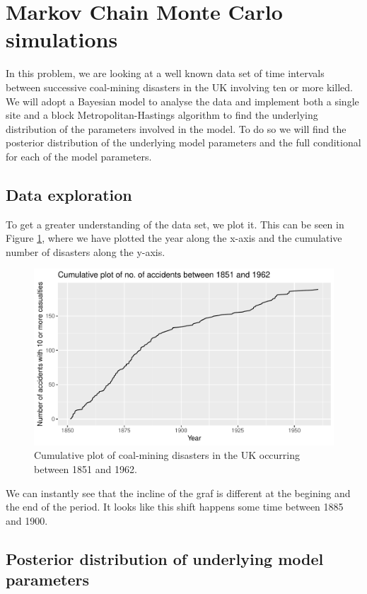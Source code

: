 \section{Markov Chain Monte Carlo simulations}

In this problem, we are looking at a well known data set of time intervals between successive coal-mining disasters in the UK involving ten or more killed. We will adopt a Bayesian model to analyse the data and implement both a single site and a block Metropolitan-Hastings algorithm to find the underlying distribution of the parameters involved in the model. To do so we will find the posterior distribution of the underlying model parameters and the full conditional for each of the model parameters. 

\subsection{Data exploration}
To get a greater understanding of the data set, we plot it. This can be seen in Figure \ref{fig:cumul_plot}, where we have plotted the year along the x-axis and the cumulative number of disasters along the y-axis. 

\begin{figure}[h]
    \centering
    \includegraphics[width = \textwidth]{Images/cumulative_plot_data.pdf}
    \caption{Cumulative plot of coal-mining disasters in the UK occurring between 1851 and 1962.}
    \label{fig:cumul_plot}
\end{figure}

We can instantly see that the incline of the graf is different at the begining and the end of the period. It looks like this shift happens some time between 1885 and 1900. 


\subsection{Posterior distribution of underlying model parameters} \label{posterior}

